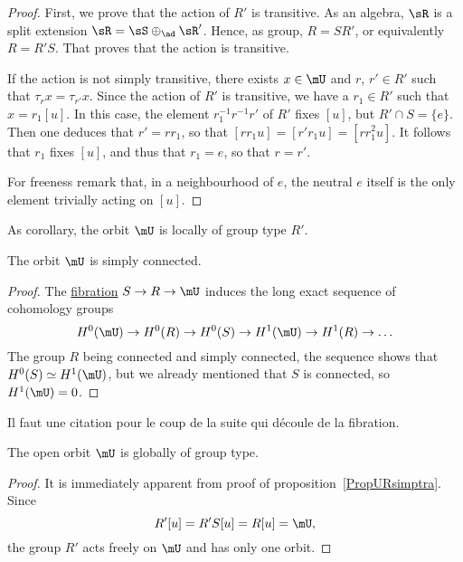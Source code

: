 \begin{proof}

First, we prove that the action of $R'$ is transitive. As an algebra, $\sR$ is a split extension $\sR=\sS\oplus_{\ad}\sR'$.  Hence, as group, $R=S R'$, or equivalently $R=R'S$. That proves that the action is transitive.

If the action is not simply transitive, there exists $x\in\mU$ and $r$, $r'\in R'$ such that $\tau_rx=\tau_{r'}x$. Since the action of $R'$ is transitive, we have a $r_1\in R'$ such that $x=r_1[u]$. In this case, the element $r_1^{-1}r^{-1}r'$ of $R'$ fixes $[u]$, but $R'\cap S=\{ e \}$. Then one deduces that $r'=rr_1$, so that $[rr_1u]=[r'r_1u]=[rr_1^2u]$. It follows that $r_1$ fixes $[u]$, and thus that $r_1=e$, so that $r=r'$.

For freeness remark that, in a neighbourhood of $e$, the neutral $e$ itself is the only element trivially acting on $[u]$.

\end{proof}

As corollary, the orbit $\mU$ is locally of group type $R'$.

\begin{proposition}     \label{PropmUsimpl}
The orbit $\mU$ is simply connected.
\end{proposition}

\begin{proof}
    The \href{http://en.wikipedia.org/wiki/Fibration}{fibration} $S\to R\to\mU$ induces the long exact sequence of cohomology groups
    \[
      H^{0}(\mU)\to H^{0}(R)\to H^{0}(S)\to H^{1}(\mU)\to H^{1}(R)\to\ldots
    \]
    The group $R$ being connected and simply connected, the sequence shows that $H^{0}(S)\simeq H^{1}(\mU)$, but we already mentioned that $S$ is connected, so $H^1(\mU)=0$.
\end{proof}

\begin{probleme}
Il faut une citation pour le coup de la suite qui découle de la fibration.
\label{ProbFibra}
\end{probleme}


\begin{corollary}
The open orbit $\mU$ is globally of group type.
\label{CormUgloGppasSym}
\end{corollary}

\begin{proof}
It is immediately apparent from proof of proposition~\ref{PropURsimptra}. Since
\[
  R'[u]=R'S[u]=R[u]=\mU,
\]
the group $R'$ acts freely on $\mU$ and has only one orbit.
\end{proof}

